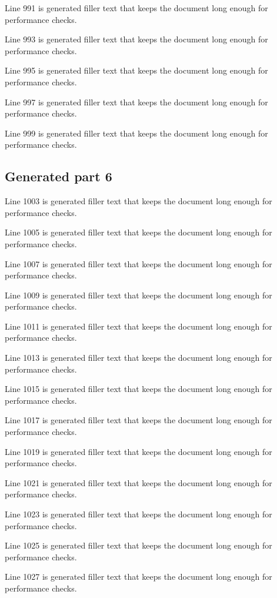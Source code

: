 Line 991 is generated filler text that keeps the document long enough for performance checks.

Line 993 is generated filler text that keeps the document long enough for performance checks.

Line 995 is generated filler text that keeps the document long enough for performance checks.

Line 997 is generated filler text that keeps the document long enough for performance checks.

Line 999 is generated filler text that keeps the document long enough for performance checks.

\subsection{Generated part 6}

Line 1003 is generated filler text that keeps the document long enough for performance checks.

Line 1005 is generated filler text that keeps the document long enough for performance checks.

Line 1007 is generated filler text that keeps the document long enough for performance checks.

Line 1009 is generated filler text that keeps the document long enough for performance checks.

Line 1011 is generated filler text that keeps the document long enough for performance checks.

Line 1013 is generated filler text that keeps the document long enough for performance checks.

Line 1015 is generated filler text that keeps the document long enough for performance checks.

Line 1017 is generated filler text that keeps the document long enough for performance checks.

Line 1019 is generated filler text that keeps the document long enough for performance checks.

Line 1021 is generated filler text that keeps the document long enough for performance checks.

Line 1023 is generated filler text that keeps the document long enough for performance checks.

Line 1025 is generated filler text that keeps the document long enough for performance checks.

Line 1027 is generated filler text that keeps the document long enough for performance checks.

